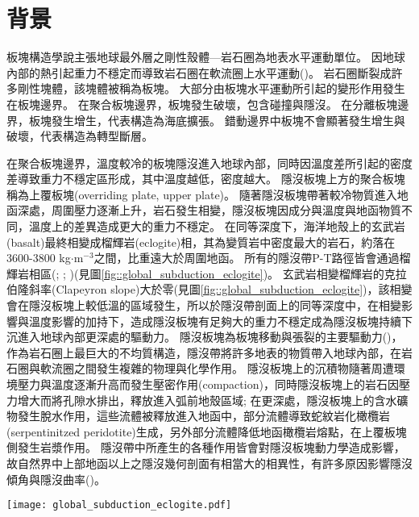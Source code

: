 \section{背景}\label{背景}

板塊構造學說主張地球最外層之剛性殼體---岩石圈為地表水平運動單位。
因地球內部的熱引起重力不穩定而導致岩石圈在軟流圈上水平運動(\citealp{jordan1978composition})。
岩石圈斷裂成許多剛性塊體，該塊體被稱為板塊。
大部分由板塊水平運動所引起的變形作用發生在板塊邊界。
在聚合板塊邊界，板塊發生破壞，包含碰撞與隱沒。
在分離板塊邊界，板塊發生增生，代表構造為海底擴張。
錯動邊界中板塊不會顯著發生增生與破壞，代表構造為轉型斷層。

在聚合板塊邊界，溫度較冷的板塊隱沒進入地球內部，同時因溫度差所引起的密度差導致重力不穩定區形成，其中溫度越低，密度越大。
隱沒板塊上方的聚合板塊稱為上覆板塊(overriding plate, upper plate)。
隨著隱沒板塊帶著較冷物質進入地函深處，周圍壓力逐漸上升，岩石發生相變，隱沒板塊因成分與溫度與地函物質不同，溫度上的差異造成更大的重力不穩定。
在同等深度下，海洋地殼上的玄武岩(basalt)最終相變成榴輝岩(eclogite)相，其為變質岩中密度最大的岩石，約落在3600-3800 kg$\cdot$m$^{-3}$之間，比重遠大於周圍地函。
所有的隱沒帶P-T路徑皆會通過榴輝岩相區(\citealp{gerya2002exhumation}; \citealp{syracuse2010global}; \citealp{penniston2015global})(見圖\ref{fig::global_subduction_eclogite})。
玄武岩相變榴輝岩的克拉伯隆斜率(Clapeyron slope)大於零(見圖\ref{fig::global_subduction_eclogite})，該相變會在隱沒板塊上較低溫的區域發生，所以於隱沒帶剖面上的同等深度中，在相變影響與溫度影響的加持下，造成隱沒板塊有足夠大的重力不穩定成為隱沒板塊持續下沉進入地球內部更深處的驅動力。
隱沒板塊為板塊移動與張裂的主要驅動力(\citealp{turcotte2002geodynamics})，作為岩石圈上最巨大的不均質構造，隱沒帶將許多地表的物質帶入地球內部，在岩石圈與軟流圈之間發生複雜的物理與化學作用。
隱沒板塊上的沉積物隨著周遭環境壓力與溫度逐漸升高而發生壓密作用(compaction)，同時隱沒板塊上的岩石因壓力增大而將孔隙水排出，釋放進入弧前地殼區域; 在更深處，隱沒板塊上的含水礦物發生脫水作用，這些流體被釋放進入地函中，部分流體導致蛇紋岩化橄欖岩(serpentinitzed peridotite)生成，另外部分流體降低地函橄欖岩熔點，在上覆板塊側發生岩漿作用。
隱沒帶中所產生的各種作用皆會對隱沒板塊動力學造成影響，故自然界中上部地函以上之隱沒幾何剖面有相當大的相異性，有許多原因影響隱沒傾角與隱沒曲率(\citealp{schellart2020control})。

\begin{figure*}[ht!]
    \centering
    \texttt{[image: global\_subduction\_eclogite.pdf]}
    \caption[全球隱沒板塊頂部的預測P-T路徑圖，摘自\citet{penniston2015global}]{
    全球隱沒板塊頂部的預測P-T路徑圖，摘自\citet{penniston2015global}。圖中標示每公里5$^\circ$、10$^\circ$、20$^\circ$的地溫梯度與藍閃岩、榴輝岩溫壓位置。(a)來自\citet{syracuse2010global}的全球隱沒板塊P-T路徑圖(紫色線)。(b)來自\citet{gerya2002exhumation}的模型，紅色線代表不同年齡的隱沒板塊P-T路徑圖。
    }
    \label{fig::global_subduction_eclogite}
\end{figure*}

